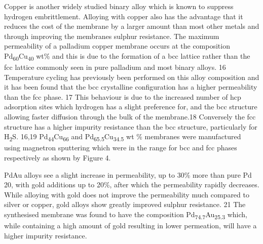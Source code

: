 Copper is another widely studied binary alloy which is known to suppress hydrogen embrittlement. Alloying with copper also has the advantage that it reduces the cost of the membrane by a larger amount than most other metals and through improving the membranes sulphur resistance. The maximum permeability of a palladium copper membrane occurs at the composition Pd\textsubscript{60}Cu\textsubscript{40} wt\% and this is due to the formation of a bcc lattice rather than the fcc lattice commonly seen in pure palladium and most binary alloys. 16 Temperature cycling has previously been performed on this alloy composition and it has been found that the bcc crystalline configuration has a higher permeability than the fcc phase. 17 This behaviour is due to the increased number of hcp adsorption sites which hydrogen has a slight preference for, and the bcc structure allowing faster diffusion through the bulk of the membrane.18 Conversely the fcc structure has a higher impurity resistance than the bcc structure, particularly for H\textsubscript{2}S. 16,19 Pd\textsubscript{44}Cu\textsubscript{66} and Pd\textsubscript{65.5}Cu\textsubscript{34.5} wt \%  membranes were manufactured using magnetron sputtering which were in the range for bcc and fcc phases respectively as shown by Figure 4.

PdAu alloys see a slight increase in permeability, up to 30\% more than pure Pd 20, with gold additions up to 20\%, after which the permeability rapidly decreases. While alloying with gold does not improve the permeability much compared to silver or copper, gold alloys show greatly improved sulphur resistance. 21 The synthesised membrane was found to have the composition  Pd\textsubscript{74.7}Au\textsubscript{25.3} which, while containing a high amount of gold resulting in lower permeation, will have a higher impurity resistance. 

